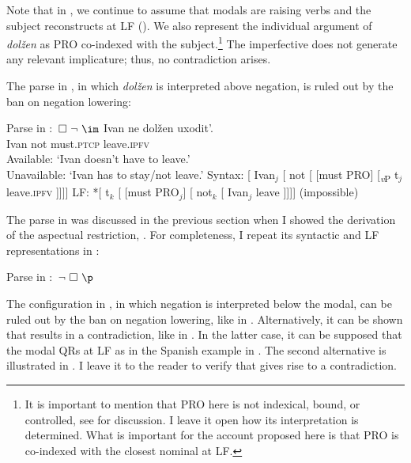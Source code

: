 \documentclass[output=paper,
modfonts,
newtxmath,colorlinks,citecolor=brown
]{langscibook}
\begin{document}
\noindent Note that in , we continue to assume that modals are raising verbs and the subject reconstructs at LF (\citealt{iatzei13}). We also represent the individual argument of \textit{dolžen} as PRO co-indexed with the subject.\footnote{It is important to mention that PRO here is not indexical, bound, or controlled, see  \citet[500]{ste07} for discussion. I leave it open how its interpretation is determined. What is important for the account proposed here is that PRO is co-indexed with the closest nominal at LF.  
}
The imperfective does not generate any relevant implicature; thus, no contradiction arises.

The parse in , in which \textit{dolžen} is interpreted above negation, is ruled out by the ban on negation lowering:

\ea Parse in :  $\,\Box\ \neg\ \im$ \label{detailsp1b}
	\ea \gll Ivan ne dolžen uxodit'. \\
  	Ivan not must.\textsc{ptcp}  leave.\textsc{ipfv}\\
  	\glt Available: `Ivan doesn't have to leave.'\\
 	Unavailable: `Ivan has to stay/not leave.'
	\ex Syntax: [ Ivan$_j$ [ not [ [must PRO]  [\textsubscript{\textit{v}P} t$_j$ leave.\textsc{ipfv} ]]]]
    \ex LF: *[ t$_k$ [ [must PRO$_j$] [ not$_k$  [ Ivan$_j$ leave  ]]]] \hfill (impossible)
            \z \z

\noindent The parse in  was discussed in the previous section when I showed the derivation of the aspectual restriction, . For completeness, I repeat its syntactic and LF representations in :

\ea  Parse in :  $\,\neg \ \Box\ \p$ \label{dtailsp1c}
	\z \z 
    
\noindent The configuration in , in which negation is interpreted below the modal, can be ruled out by the ban on negation lowering, like in  .  Alternatively, it can be shown that  results in a contradiction, like in . In the latter case, it can be supposed that the modal QRs at LF as in the Spanish example in . The second alternative is illustrated in . I leave it to the reader to verify that  gives rise to a contradiction.
  
\end{document}
